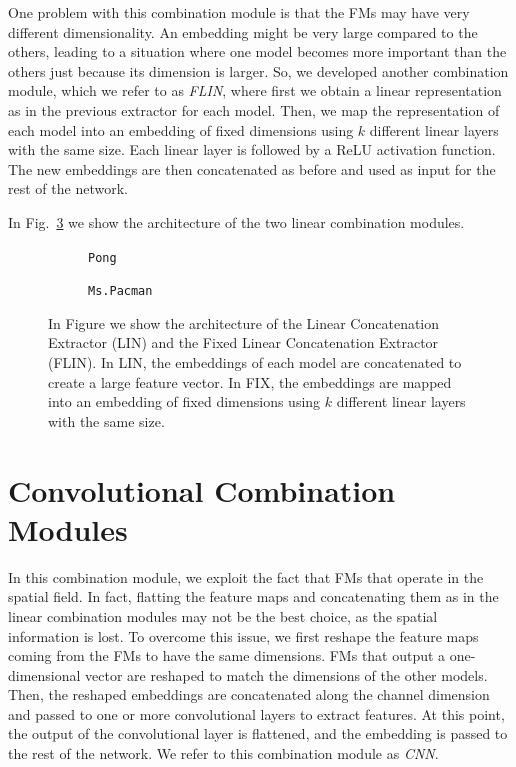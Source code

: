 One problem with this combination module is that the FMs may have very different dimensionality.
An embedding might be very large compared to the others, leading to a situation where one model becomes more important than the others just because its dimension is larger.
So, we developed another combination module, which we refer to as \textit{FLIN}, where first we obtain a linear representation as in the previous extractor for each model.
Then, we map the representation of each model into an embedding of fixed dimensions using $k$ different linear layers with the same size.
Each linear layer is followed by a ReLU activation function.
The new embeddings are then concatenated as before and used as input for the rest of the network.

In Fig.~\ref{fig:lin_combination} we show the architecture of the two linear combination modules.


\begin{figure}[ht]
    \centering
    \begin{subfigure}[b]{0.47\textwidth}
        \centering
        \fbox{\rule[-.5cm]{0cm}{4cm} \rule[-.5cm]{4cm}{0cm}}
        \caption{\texttt{Pong}}
        \label{fig:lin}
    \end{subfigure}
    \hfill
    \begin{subfigure}[b]{0.47\textwidth}
        \centering
        \fbox{\rule[-.5cm]{0cm}{4cm} \rule[-.5cm]{4cm}{0cm}}
        \caption{\texttt{Ms.Pacman}}
        \label{fig:fix_lin}
    \end{subfigure}

    \caption{In Figure we show the architecture of the Linear Concatenation Extractor (LIN) and the Fixed Linear Concatenation Extractor (FLIN). In LIN, the embeddings of each model are concatenated to create a large feature vector. In FIX, the embeddings are mapped into an embedding of fixed dimensions using $k$ different linear layers with the same size.}
    \label{fig:lin_combination}
\end{figure}




\section{Convolutional Combination Modules}
\label{sec:convolutional_combination}
In this combination module, we exploit the fact that FMs that operate in the spatial field.
In fact, flatting the feature maps and concatenating them as in the linear combination modules may not be the best choice, as the spatial information is lost.
To overcome this issue, we first reshape the feature maps coming from the FMs to have the same dimensions.
FMs that output a one-dimensional vector are reshaped to match the dimensions of the other models.
Then, the reshaped embeddings are concatenated along the channel dimension and passed to one or more convolutional layers to extract features.
At this point, the output of the convolutional layer is flattened, and the embedding is passed to the rest of the network.
We refer to this combination module as \textit{CNN}.


